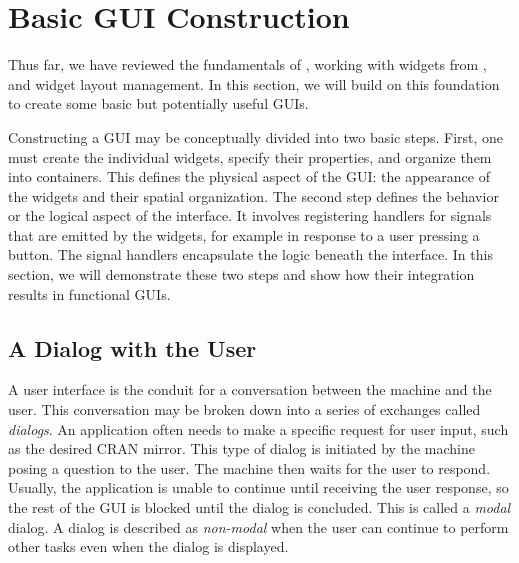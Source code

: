 \documentclass[article]{jss}
\begin{document}

\section{Basic GUI Construction}


Thus far, we have reviewed the fundamentals of , working
with
 widgets from , and widget layout management. In
this
section, we will build on this foundation to create some basic but
potentially
useful GUIs. 

Constructing a GUI may be conceptually divided into two basic steps.
First, one must create the individual widgets, specify their
properties,
and organize them into containers. This defines the physical aspect
of the GUI: the appearance of the widgets and their spatial
organization.
The second step defines the behavior or the logical aspect of the
interface. It involves registering handlers for signals that are
emitted
by the widgets, for example in response to a user pressing a button.
The signal handlers encapsulate the logic beneath the interface. In
this
section, we will demonstrate these two steps and show how their
integration
results in functional GUIs.

\subsection{A Dialog with the User}\label{sec:dialog-example}

A user interface is the conduit for a conversation between the machine
and the user. This conversation may be broken down into a series of
exchanges called \emph{dialogs}. An application often needs to make a
specific request for user input, such as the desired CRAN mirror. This
type of dialog is initiated by the machine posing a question to the
user. The machine then waits for the user to respond. Usually, the
application is unable to continue until receiving the user response,
so the rest of the GUI is blocked until the dialog is concluded. This
is called a \emph{modal} dialog.  A dialog is described as
\emph{non-modal} when the user can continue to perform other tasks
even when the dialog is displayed.
\end{document}

